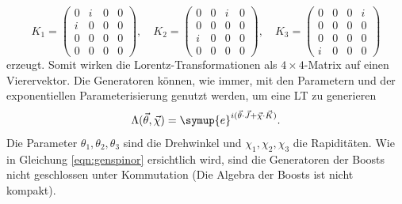 \documentclass[
  captions=tableheading,  %
  titlepage=firstiscover, %
]{scrartcl}
\begin{document}
\begin{equation*}
  K_1 = 
  \begin{pmatrix}
    0 & i   & 0   & 0 \\
    i & 0   & 0   & 0 \\
    0 & 0   & 0   & 0 \\
    0 & 0   & 0   & 0  
  \end{pmatrix}, \quad
  K_2 = 
  \begin{pmatrix}
    0 & 0 & i & 0 \\
    0 & 0 & 0 & 0 \\
    i & 0 & 0 & 0 \\
    0 & 0 & 0 & 0 
  \end{pmatrix}, \quad 
  K_3 = 
  \begin{pmatrix}
    0 & 0 & 0 & i \\
    0 & 0 & 0 & 0 \\
    0 & 0 & 0 & 0 \\
    i & 0 & 0 & 0 
  \end{pmatrix}
\end{equation*}
erzeugt.
Somit wirken die Lorentz-Transformationen als $4 \times 4$-Matrix auf einen Vierervektor.
Die Generatoren können, wie immer, mit den Parametern und der exponentiellen Parameterisierung genutzt werden, um eine 
LT zu generieren
\begin{equation*}
 \Lambda(\vec{\theta}, \vec{\chi}) =  \symup{e}^{i(\vec{\theta} \cdot \vec{J} + \vec{\chi} \cdot \vec{K})}.
\end{equation*}
Die Parameter $\theta_1, \theta_2, \theta_3$ sind die Drehwinkel und $\chi_1,\chi_2,\chi_3$ die Rapiditäten.
Wie in Gleichung \eqref{eqn:genspinor} ersichtlich wird, sind die Generatoren der Boosts nicht geschlossen unter Kommutation 
(Die Algebra der Boosts ist nicht kompakt).
\end{document}
